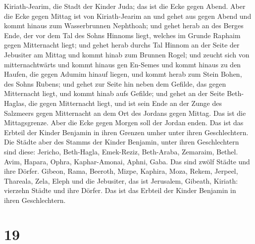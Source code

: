 Kiriath-Jearim, die Stadt der Kinder Juda; das ist die Ecke gegen Abend.
 Aber die Ecke gegen Mittag ist von Kiriath-Jearim an und
gehet aus gegen Abend und kommt hinaus zum Wasserbrunnen Nephthoah;
 und gehet herab an des Berges Ende, der vor dem Tal des
Sohns Hinnoms liegt, welches im Grunde Raphaim gegen Mitternacht liegt;
und gehet herab durchs Tal Hinnom an der Seite der Jebusiter am Mittag
und kommt hinab zum Brunnen Rogel;  und zeucht sich von
mitternachtwärts und kommt hinaus gen En-Semes und kommt hinaus zu den
Haufen, die gegen Adumim hinauf liegen, und kommt herab zum Stein Bohen,
des Sohns Rubens;  und gehet zur Seite hin neben dem
Gefilde, das gegen Mitternacht liegt, und kommt hinab aufs Gefilde;
 und gehet an der Seite Beth-Haglas, die gegen Mitternacht
liegt, und ist sein Ende an der Zunge des Salzmeers gegen Mitternacht an
dem Ort des Jordans gegen Mittag. Das ist die Mittagsgrenze.
 Aber die Ecke gegen Morgen soll der Jordan enden. Das ist
das Erbteil der Kinder Benjamin in ihren Grenzen umher unter ihren
Geschlechtern.  Die Städte aber des Stamms der Kinder
Benjamin, unter ihren Geschlechtern sind diese: Jericho, Beth-Hagla,
Emek-Reziz,  Beth-Araba, Zemaraim, Bethel. 
Avim, Hapara, Ophra,  Kaphar-Amonai, Aphni, Gaba. Das sind
zwölf Städte und ihre Dörfer.  Gibeon, Rama, Beeroth,
 Mizpe, Kaphira, Moza,  Rekem, Jerpeel,
Thareala,  Zela, Eleph und die Jebusiter, das ist
Jerusalem, Gibeath, Kiriath: vierzehn Städte und ihre Dörfer. Das ist
das Erbteil der Kinder Benjamin in ihren Geschlechtern.

\hypertarget{section-18}{%
\section{19}\label{section-18}}

